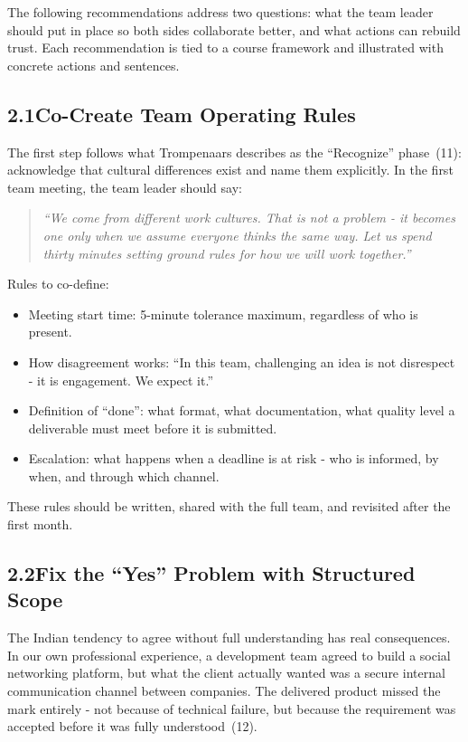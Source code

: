 \documentclass[12pt, a4paper]{article}
\begin{document}
The following recommendations address two questions: what the team leader should put in place so both sides collaborate better, and what actions can rebuild trust. Each recommendation is tied to a course framework and illustrated with concrete actions and sentences.

\subsection*{2.1\quad Co-Create Team Operating Rules}

The first step follows what Trompenaars describes as the ``Recognize'' phase~(11): acknowledge that cultural differences exist and name them explicitly. In the first team meeting, the team leader should say:

\begin{quote}
\textit{``We come from different work cultures. That is not a problem - it becomes one only when we assume everyone thinks the same way. Let us spend thirty minutes setting ground rules for how we will work together.''}
\end{quote}

Rules to co-define:
\begin{itemize}[noitemsep]
    \item Meeting start time: 5-minute tolerance maximum, regardless of who is present.
    \item How disagreement works: ``In this team, challenging an idea is not disrespect - it is engagement. We expect it.''
    \item Definition of ``done'': what format, what documentation, what quality level a deliverable must meet before it is submitted.
    \item Escalation: what happens when a deadline is at risk - who is informed, by when, and through which channel.
\end{itemize}

These rules should be written, shared with the full team, and revisited after the first month.

\subsection*{2.2\quad Fix the ``Yes'' Problem with Structured Scope}

The Indian tendency to agree without full understanding has real consequences. In our own professional experience, a development team agreed to build a social networking platform, but what the client actually wanted was a secure internal communication channel between companies. The delivered product missed the mark entirely - not because of technical failure, but because the requirement was accepted before it was fully understood~(12).
\end{document}
